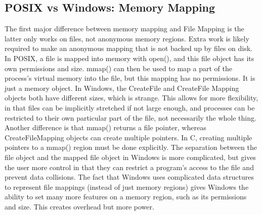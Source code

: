 \documentclass[11pt]{article}
\begin{document}
\subsection{POSIX vs Windows: Memory Mapping}
The first major difference between memory mapping and File Mapping is the latter only works on files, not anonymous memory regions. Extra work is likely required to make an anonymous mapping that is not backed up by files on disk. In POSIX, a file is mapped into memory with open(), and this file object has its own permissions and size. mmap() can then be used to map a part of the process's virtual memory into the file, but this mapping has no permissions. It is just a memory object. In Windows, the CreateFile and CreateFile Mapping objects both have different sizes, which is strange. This allows for more flexibility, in that files can be implicitly stretched if not large enough, and processes can be restricted to their own particular part of the file, not necessarily the whole thing. Another difference is that mmap() returns a file pointer, whereas CreateFileMapping objects can create multiple pointers. In C, creating multiple pointers to a mmap() region must be done explicitly. The separation between the file object and the mapped file object in Windows is more complicated, but gives the user more control in that they can restrict a program's access to the file and prevent data collisions. The fact that Windows uses complicated data structures to represent file mappings (instead of just memory regions) gives Windows the ability to set many more features on a memory region, such as its permissions and size. This creates overhead but more power. \\
\end{document}
